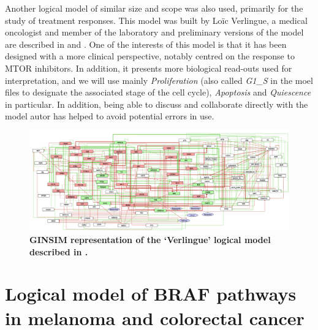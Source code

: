\documentclass[a4paper,12pt,twoside,onecolumn,openright,final,oldfontcommands]{memoir}
\begin{document}
Another logical model of similar size and scope was also used, primarily
for the study of treatment responses. This model was built by Loïc
Verlingue, a medical oncologist and member of the laboratory and
preliminary versions of the model are described in
\citet{verlingue2016comprehensive} and \citet{verlingue2016silico}. One
of the interests of this model is that it has been designed with a more
clinical perspective, notably centred on the response to MTOR
inhibitors. In addition, it presents more biological read-outs used for
interpretation, and we will use mainly \emph{Proliferation} (also called
\emph{G1\_S} in the moel files to designate the associated stage of the
cell cycle), \emph{Apoptosis} and \emph{Quiescence} in particular. In
addition, being able to discuss and collaborate directly with the model
autor has helped to avoid potential errors in use.

\begin{figure}

{\centering \includegraphics[width=0.9\linewidth]{fig/Verlingue} 

}

\caption[Graphical abstract of PROFILE method to personalize logical models with omics data]{\textbf{GINSIM representation of the `Verlingue'
logical model described in \citet{verlingue2016silico}.}}\label{fig:Verlingue}
\end{figure}




\section{Logical model of BRAF pathways in melanoma and colorectal
cancer}\label{appendix-pantolini}
\end{document}
